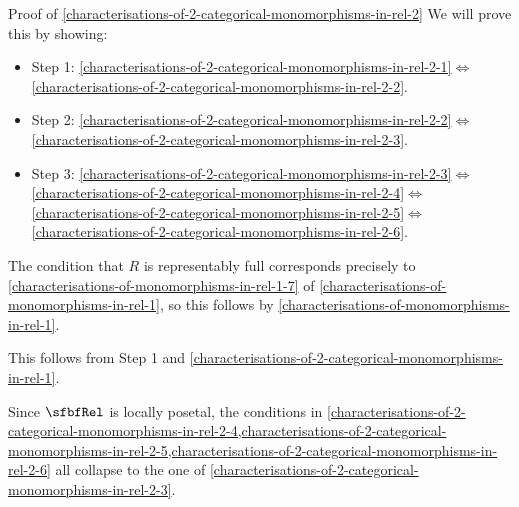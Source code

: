 \begin{Proof}{Proof of \cref{characterisations-of-2-categorical-monomorphisms-in-rel-2}}%
    We will prove this by showing:
    \begin{itemize}
        \item Step 1: \cref{characterisations-of-2-categorical-monomorphisms-in-rel-2-1}$\iff$\cref{characterisations-of-2-categorical-monomorphisms-in-rel-2-2}.
        \item Step 2: \cref{characterisations-of-2-categorical-monomorphisms-in-rel-2-2}$\iff$\cref{characterisations-of-2-categorical-monomorphisms-in-rel-2-3}.
        \item Step 3: \cref{characterisations-of-2-categorical-monomorphisms-in-rel-2-3}$\iff$\cref{characterisations-of-2-categorical-monomorphisms-in-rel-2-4}$\iff$\cref{characterisations-of-2-categorical-monomorphisms-in-rel-2-5}$\iff$\cref{characterisations-of-2-categorical-monomorphisms-in-rel-2-6}.
    \end{itemize}

    The condition that $R$ is representably full corresponds precisely to \cref{characterisations-of-monomorphisms-in-rel-1-7} of \cref{characterisations-of-monomorphisms-in-rel-1}, so this follows by \cref{characterisations-of-monomorphisms-in-rel-1}.

    This follows from Step 1 and \cref{characterisations-of-2-categorical-monomorphisms-in-rel-1}.

    Since $\sfbfRel$ is locally posetal, the conditions in \cref{characterisations-of-2-categorical-monomorphisms-in-rel-2-4,characterisations-of-2-categorical-monomorphisms-in-rel-2-5,characterisations-of-2-categorical-monomorphisms-in-rel-2-6} all collapse to the one of \cref{characterisations-of-2-categorical-monomorphisms-in-rel-2-3}.
\end{Proof}
